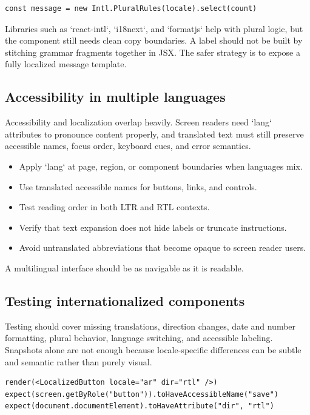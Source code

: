 \begin{verbatim}
const message = new Intl.PluralRules(locale).select(count)
\end{verbatim}

Libraries such as `react-intl`, `i18next`, and `formatjs` help with plural logic, but the component still needs clean copy boundaries. A label should not be built by stitching grammar fragments together in JSX. The safer strategy is to expose a fully localized message template.

\subsection{Accessibility in multiple languages}
Accessibility and localization overlap heavily. Screen readers need `lang` attributes to pronounce content properly, and translated text must still preserve accessible names, focus order, keyboard cues, and error semantics.

\begin{itemize}[leftmargin=*, itemsep=0.35em]
  \item Apply `lang` at page, region, or component boundaries when languages mix.
  \item Use translated accessible names for buttons, links, and controls.
  \item Test reading order in both LTR and RTL contexts.
  \item Verify that text expansion does not hide labels or truncate instructions.
  \item Avoid untranslated abbreviations that become opaque to screen reader users.
\end{itemize}

A multilingual interface should be as navigable as it is readable.

\subsection{Testing internationalized components}
Testing should cover missing translations, direction changes, date and number formatting, plural behavior, language switching, and accessible labeling. Snapshots alone are not enough because locale-specific differences can be subtle and semantic rather than purely visual.

\begin{verbatim}
render(<LocalizedButton locale="ar" dir="rtl" />)
expect(screen.getByRole("button")).toHaveAccessibleName("save")
expect(document.documentElement).toHaveAttribute("dir", "rtl")
\end{verbatim}

